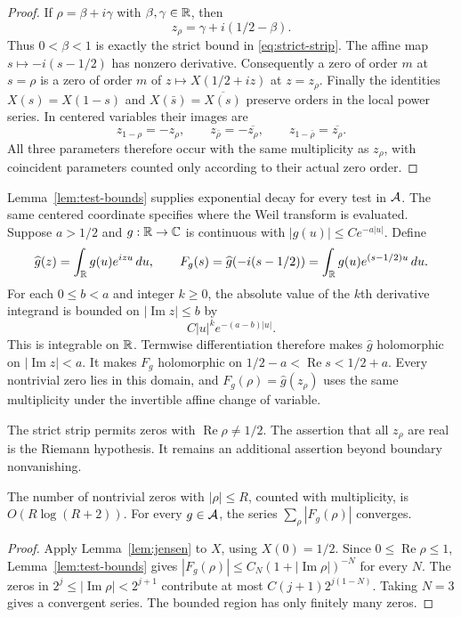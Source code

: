 \begin{proof}
If $\rho=\beta+i\gamma$ with $\beta,\gamma\in\mathbb R$, then
\[
 z_\rho=\gamma+i(1/2-\beta).
\]
Thus $0<\beta<1$ is exactly the strict bound in
\eqref{eq:strict-strip}.
The affine map $s\mapsto-i(s-1/2)$ has nonzero derivative.
Consequently a zero of order $m$ at $s=\rho$ is a zero of order $m$
of $z\mapsto X(1/2+iz)$ at $z=z_\rho$.
Finally the identities $X(s)=X(1-s)$ and
$X(\bar s)=\overline{X(s)}$ preserve orders in the local power series.
In centered variables their images are
\[
 z_{1-\rho}=-z_\rho,\qquad
 z_{\bar\rho}=-\overline{z_\rho},\qquad
 z_{1-\bar\rho}=\overline{z_\rho}.
\]
All three parameters therefore occur with the same multiplicity as
$z_\rho$, with coincident parameters counted only according to their
actual zero order.
\end{proof}

Lemma~\ref{lem:test-bounds} supplies exponential decay for every test in $\mathcal A$.
The same centered coordinate specifies where the Weil transform is
evaluated.  Suppose $a>1/2$ and $g:\mathbb R\to\mathbb C$ is continuous with
$|g(u)|\leq C e^{-a|u|}$.
Define
\[
 \widehat g(z)=\int_{\mathbb R}g(u)e^{izu}\,du,
 \qquad
 F_g(s)=\widehat g(-i(s-1/2))
       =\int_{\mathbb R}g(u)e^{(s-1/2)u}\,du.
\]
For each $0\leq b<a$ and integer $k\geq0$, the absolute value of the
$k$th derivative integrand is bounded on $|\operatorname{Im}z|\leq b$ by
\[
 C|u|^k e^{-(a-b)|u|}.
\]
This is integrable on $\mathbb R$.
Termwise differentiation therefore makes $\widehat g$ holomorphic on
$|\operatorname{Im}z|<a$.
It makes $F_g$ holomorphic on
$1/2-a<\operatorname{Re}s<1/2+a$.
Every nontrivial zero lies in this domain, and
$F_g(\rho)=\widehat g(z_\rho)$ uses the same multiplicity under the
invertible affine change of variable.

The strict strip permits zeros with $\operatorname{Re}\rho\ne1/2$.
The assertion that all $z_\rho$ are real is the Riemann hypothesis.
It remains an additional assertion beyond boundary nonvanishing.

\begin{corollary}
\label{cor:zero-count}
The number of nontrivial zeros with $|\rho|\leq R$, counted with multiplicity,
is $O(R\log(R+2))$.
For every $g\in\mathcal A$, the series $\sum_\rho|F_g(\rho)|$ converges.
\end{corollary}

\begin{proof}
Apply Lemma~\ref{lem:jensen} to $X$, using $X(0)=1/2$.
Since $0\leq\operatorname{Re}\rho\leq1$, Lemma~\ref{lem:test-bounds}
gives $|F_g(\rho)|\leq C_N(1+|\operatorname{Im}\rho|)^{-N}$ for every $N$.
The zeros in $2^j\leq|\operatorname{Im}\rho|<2^{j+1}$ contribute at most
$C(j+1)2^{j(1-N)}$.  Taking $N=3$ gives a convergent series.
The bounded region has only finitely many zeros.
\end{proof}

